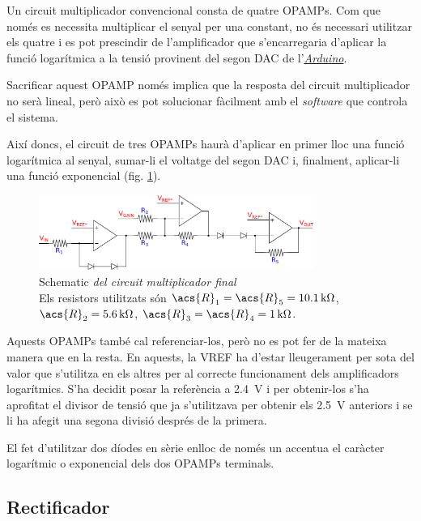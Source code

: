 Un circuit multiplicador convencional consta de quatre \acp{OPAMP}. Com que només es necessita multiplicar el senyal per una constant, no és necessari utilitzar els quatre i es pot prescindir de l'amplificador que s'encarregaria d'aplicar la funció logarítmica a la tensió provinent del segon \ac{DAC} de l'\hyperref[subsec:arduino]{\textit{Arduino}}.

Sacrificar aquest \ac{OPAMP} només implica que la resposta del circuit multiplicador no serà lineal, però això es pot solucionar fàcilment amb el \textit{software} que controla el sistema.

Així doncs, el circuit de tres \acp{OPAMP} haurà d'aplicar en primer lloc una funció logarítmica al senyal, sumar-li el voltatge del segon \ac{DAC} i, finalment, aplicar-li una funció exponencial (fig. \ref{fig:schematic_multiplicador}).

\begin{figure}[htp]
	\centering
	\includegraphics[width=0.8\textwidth]{Figures/schematic_multiplicador.pdf}
	\caption[Circuit multiplicador final]{Schematic\textit{ del circuit multiplicador final}\\{\footnotesize Els resistors utilitzats són $ \acs{R}_1 = \acs{R}_5 = \SI{10.1}{\kilo\ohm} $, $ \acs{R}_2 = \SI{5.6}{\kilo\ohm} $, $ \acs{R}_3 = \acs{R}_4 = \SI{1}{\kilo\ohm} $.}}
	\label{fig:schematic_multiplicador}
\end{figure}

Aquests \acp{OPAMP} també cal referenciar-los, però no es pot fer de la mateixa manera que en la resta. En aquests, la \ac{VREF} ha d'estar lleugerament per sota del valor que s'utilitza en els altres per al correcte funcionament dels amplificadors logarítmics. S'ha decidit posar la referència a \SI{2.4}{\volt} i per obtenir-los s'ha aprofitat el divisor de tensió que ja s'utilitzava per obtenir els \SI{2.5}{\volt} anteriors i se li ha afegit una segona divisió després de la primera.

El fet d'utilitzar dos díodes en sèrie enlloc de només un accentua el caràcter logarítmic o exponencial  dels dos \acp{OPAMP} terminals.

\subsection{Rectificador}\label{subsec:rectificador}

